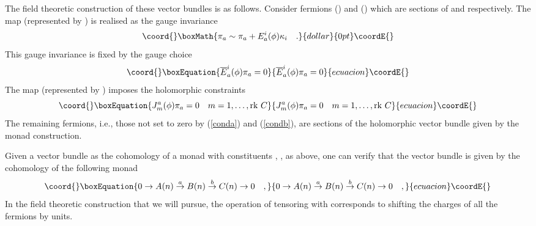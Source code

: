 \documentclass[a4paper,12pt]{article}
\begin{document}
The field theoretic construction of these vector bundles is as
follows\cite{wittenphases}.
Consider fermions \coordHE{} (\coordHE{}) and \coordHE{}
(\coordHE{})
which are sections of \coordHE{} and \coordHE{} respectively.  The map \coordHE{} 
(represented by  \coordHE{}) is realised as the gauge invariance
$$\coord{}\boxMath{
\pi_a \sim \pi_a + E^i_a(\phi) \kappa_i \quad.
}{dollar}{0pt}\coordE{}$$
This gauge invariance is fixed by the gauge choice
\begin{equation}\coord{}\boxEquation{
\overline{E}_a^i(\phi) \pi_a =0
\label{conda}
}{
\overline{E}_a^i(\phi) \pi_a =0
}{ecuacion}\coordE{}\end{equation}
The map \coordHE{} (represented by \coordHE{}) imposes the holomorphic
constraints
\begin{equation}\coord{}\boxEquation{
J^a_m(\phi)\pi_a =0\quad m=1,\ldots,{\rm rk}\ C
\label{condb}
}{
J^a_m(\phi)\pi_a =0\quad m=1,\ldots,{\rm rk}\ C
}{ecuacion}\coordE{}\end{equation}
The remaining fermions, i.e., those not set to zero by (\ref{conda}) and
(\ref{condb}), are sections of the holomorphic vector bundle \coordHE{} given
by the monad construction.  

Given a vector bundle \coordHE{} as the cohomology of a monad with constituents
\coordHE{}, \coordHE{}, \coordHE{} as above, one can verify that the vector bundle
\coordHE{} is given by the cohomology of the following
monad
\begin{equation}\coord{}\boxEquation{
0\rightarrow A(n) \stackrel{a}{\rightarrow} B(n) \stackrel{b}{\rightarrow}
C(n) \rightarrow 0\quad,
}{
0\rightarrow A(n) \stackrel{a}{\rightarrow} B(n) \stackrel{b}{\rightarrow}
C(n) \rightarrow 0\quad,
}{ecuacion}\coordE{}\end{equation}
In the field theoretic construction that we will pursue, the operation
of tensoring with \coordHE{} corresponds to shifting the charges of
all the fermions by \coordHE{} units.
\end{document}
